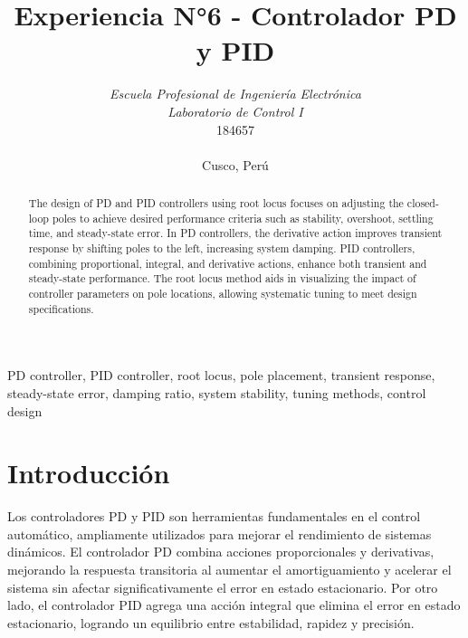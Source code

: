 \documentclass[conference]{IEEEtran}
\begin{document}
	
	\title{Experiencia N°6 - Controlador PD y PID}
	\author{	
		\textit{Escuela Profesional de Ingeniería Electrónica}\\
		\textit{Laboratorio de Control I}\\
		184657 \\\\
		Cusco, Perú
	}
	
	\maketitle
	
	\begin{abstract}
		The design of PD and PID controllers using root locus focuses on adjusting the closed-loop poles to achieve desired performance criteria such as stability, overshoot, settling time, and steady-state error. In PD controllers, the derivative action improves transient response by shifting poles to the left, increasing system damping. PID controllers, combining proportional, integral, and derivative actions, enhance both transient and steady-state performance. The root locus method aids in visualizing the impact of controller parameters on pole locations, allowing systematic tuning to meet design specifications.
	\end{abstract}
	
	\begin{IEEEkeywords}
		PD controller, PID controller, root locus, pole placement, transient response, steady-state error, damping ratio, system stability, tuning methods, control design
	\end{IEEEkeywords}
	
	\section{Introducción}
	
		Los controladores PD y PID son herramientas fundamentales en el control automático, ampliamente utilizados para mejorar el rendimiento de sistemas dinámicos. El controlador PD combina acciones proporcionales y derivativas, mejorando la respuesta transitoria al aumentar el amortiguamiento y acelerar el sistema sin afectar significativamente el error en estado estacionario. Por otro lado, el controlador PID agrega una acción integral que elimina el error en estado estacionario, logrando un equilibrio entre estabilidad, rapidez y precisión.
		
\end{document}
